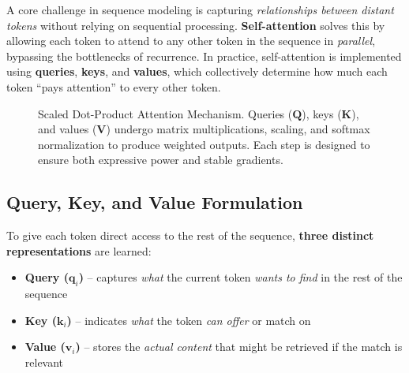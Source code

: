\noindent
A core challenge in sequence modeling is capturing \emph{relationships between distant tokens} without relying on sequential processing. \textbf{Self-attention} solves this by allowing each token to attend to any other token in the sequence in \emph{parallel}, bypassing the bottlenecks of recurrence. In practice, self-attention is implemented using \textbf{queries}, \textbf{keys}, and \textbf{values}, which collectively determine how much each token “pays attention” to every other token.

\begin{figure}[h]
\centering
{}
\caption{Scaled Dot-Product Attention Mechanism. Queries ($\mathbf{Q}$), keys ($\mathbf{K}$), and values ($\mathbf{V}$) undergo matrix multiplications, scaling, and softmax normalization to produce weighted outputs. Each step is designed to ensure both expressive power and stable gradients.}
\label{fig:attention_mechanism}
\end{figure}

\subsection{Query, Key, and Value Formulation}
\noindent
To give each token direct access to the rest of the sequence, \textbf{three distinct representations} are learned:
\begin{itemize}
    \item \textbf{Query ($\mathbf{q}_i$)} – captures \emph{what} the current token \emph{wants to find} in the rest of the sequence
    \item \textbf{Key ($\mathbf{k}_i$)} – indicates \emph{what} the token \emph{can offer} or match on
    \item \textbf{Value ($\mathbf{v}_i$)} – stores the \emph{actual content} that might be retrieved if the match is relevant
\end{itemize}

